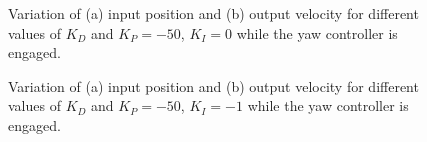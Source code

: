 \begin{figure}
  \centering
  \caption{Variation of (a) input position and (b) output velocity for different values of $K_{D}$ and $K_P=-50$, $K_I=0$ while the yaw controller is engaged.}\label{fig:tune-yaw-der-i0}
\end{figure}

\begin{figure}
  \centering
  \caption{Variation of (a) input position and (b) output velocity for different values of $K_{D}$ and $K_P=-50$, $K_I=-1$ while the yaw controller is engaged.}\label{fig:tune-yaw-der-i1}
\end{figure}

